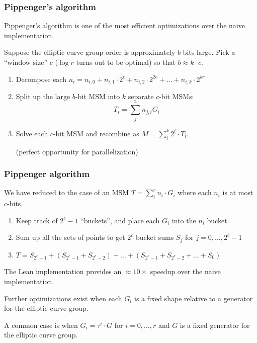\documentclass[options]{beamer}
\begin{document}
\begin{frame}
    \frametitle{Pippenger's algorithm}

    Pippenger's algorithm is one of the most efficient optimizations over the naive implementation.
    
    Suppose the elliptic curve group order is approximately $b$ bits large. Pick a ``window size'' $c$ ($\log r$ turns out to be optimal) so that $b \approx k \cdot c$. 
    \begin{enumerate}
        \item  Decompose each $n_i = n_{i, 0} + n_{i, 1} \cdot 2^c + n_{i, 2} \cdot 2^{2c} + \ldots + n_{i, k} \cdot 2^{k c}$
        \item Split up the large $b$-bit MSM into $k$ separate $c$-bit MSMs:
        $$
        T_i = \sum_j^r n_{j, i} G_i
        $$
        \item Solve each $c$-bit MSM and recombine as $M = \sum_i^k 2^i \cdot T_i$. 
        
        (perfect opportunity for parallelization)
    \end{enumerate}

\end{frame}

\begin{frame}
    \frametitle{Pippenger algorithm}

    We have reduced to the case of an MSM $T = \sum_i^r n_i \cdot G_i$ where each $n_i$ is at most $c$-bits.

    \begin{enumerate}
    \item Keep track of $2^c - 1$ ``buckets'', and place each $G_i$ into the $n_i$ bucket.
    \item Sum up all the sets of points to get $2^c$ bucket sums $S_j$ for $j = 0, \ldots, 2^c - 1$
    \item $T = S_{2^c -1} + (S_{2^c -1} + S_{2^c -2}) + \ldots + (S_{2^c -1} + S_{2^c -2} + \ldots + S_0)$
    \end{enumerate}

    The Lean implementation provides an $\approx 10 \times$ speedup over the naive implementation.

    Further optimizations exist when each $G_i$ is a fixed shape relative to a generator for the elliptic curve group.

    A common case is when $G_i = \tau^i \cdot G$ for $i = 0, \ldots, r$ and $G$ is a fixed generator for the elliptic curve group.
\end{frame}
\end{document}
